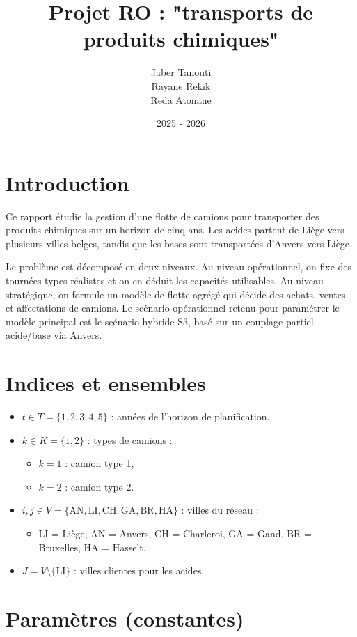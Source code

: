 \documentclass{article}
\title{Projet  RO : "transports de produits chimiques" }
\author{Jaber Tanouti \\ Rayane Rekik \\ Reda Atonane }
\date{2025 - 2026}
\begin{document}
\maketitle

\section{Introduction}

Ce rapport étudie la gestion d'une flotte de camions pour transporter des
produits chimiques sur un horizon de cinq ans. Les acides partent de Liège vers
plusieurs villes belges, tandis que les bases sont transportées d'Anvers vers
Liège.

Le problème est décomposé en deux niveaux. Au niveau opérationnel, on fixe des
tournées-types réalistes et on en déduit les capacités utilisables. Au niveau
stratégique, on formule un modèle de flotte agrégé qui décide des achats, ventes
et affectations de camions. Le scénario opérationnel retenu pour paramétrer le
modèle principal est le scénario hybride S3, basé sur un couplage partiel
acide/base via Anvers.

\section{Indices et ensembles}

\begin{itemize}
  \item $t \in T = \{1,2,3,4,5\}$ : années de l'horizon de planification.
  \item $k \in K = \{1,2\}$ : types de camions :
  \begin{itemize}
    \item $k=1$ : camion type 1,
    \item $k=2$ : camion type 2.
  \end{itemize}
  \item $i,j \in V = \{\mathrm{AN},\mathrm{LI},\mathrm{CH},\mathrm{GA},\mathrm{BR},\mathrm{HA}\}$ : villes du réseau :
  \begin{itemize}
    \item LI = Liège, AN = Anvers, CH = Charleroi, GA = Gand, BR = Bruxelles, HA = Hasselt.
  \end{itemize}
  \item $J = V \setminus \{\mathrm{LI}\}$ : villes clientes pour les acides.
\end{itemize}

\section{Paramètres (constantes)}
\end{document}
